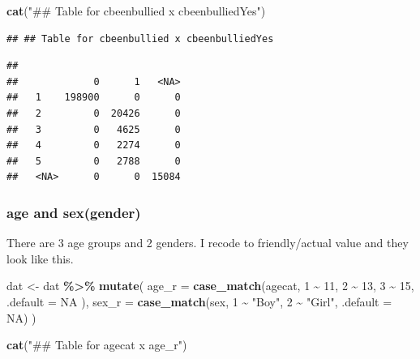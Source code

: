 \documentclass[
]{article}
\newenvironment{Shaded}{\begin{snugshade}}{\end{snugshade}}
\newcommand{\AttributeTok}[1]{\textcolor[rgb]{0.13,0.29,0.53}{#1}}
\newcommand{\ConstantTok}[1]{\textcolor[rgb]{0.56,0.35,0.01}{#1}}
\newcommand{\DecValTok}[1]{\textcolor[rgb]{0.00,0.00,0.81}{#1}}
\newcommand{\FunctionTok}[1]{\textcolor[rgb]{0.13,0.29,0.53}{\textbf{#1}}}
\newcommand{\NormalTok}[1]{#1}
\newcommand{\OtherTok}[1]{\textcolor[rgb]{0.56,0.35,0.01}{#1}}
\newcommand{\SpecialCharTok}[1]{\textcolor[rgb]{0.81,0.36,0.00}{\textbf{#1}}}
\newcommand{\StringTok}[1]{\textcolor[rgb]{0.31,0.60,0.02}{#1}}
\begin{document}
\begin{Shaded}
\begin{Highlighting}[]
\FunctionTok{cat}\NormalTok{(}\StringTok{"\#\# Table for cbeenbullied x cbeenbulliedYes"}\NormalTok{)}
\end{Highlighting}
\end{Shaded}

\begin{verbatim}
## ## Table for cbeenbullied x cbeenbulliedYes
\end{verbatim}

\begin{Shaded}
\end{Shaded}

\begin{verbatim}
##       
##             0      1   <NA>
##   1    198900      0      0
##   2         0  20426      0
##   3         0   4625      0
##   4         0   2274      0
##   5         0   2788      0
##   <NA>      0      0  15084
\end{verbatim}

\subsubsection{age and sex(gender)}\label{age-and-sexgender}

There are 3 age groups and 2 genders. I recode to friendly/actual value
and they look like this.

\begin{Shaded}
\begin{Highlighting}[]
\NormalTok{dat }\OtherTok{\textless{}{-}}\NormalTok{ dat }\SpecialCharTok{\%\textgreater{}\%}
  \FunctionTok{mutate}\NormalTok{(}
    \AttributeTok{age\_r =} \FunctionTok{case\_match}\NormalTok{(agecat,}
                             \DecValTok{1} \SpecialCharTok{\textasciitilde{}} \DecValTok{11}\NormalTok{,}
                             \DecValTok{2} \SpecialCharTok{\textasciitilde{}} \DecValTok{13}\NormalTok{,}
                             \DecValTok{3} \SpecialCharTok{\textasciitilde{}} \DecValTok{15}\NormalTok{,}
                             \AttributeTok{.default =} \ConstantTok{NA}
\NormalTok{                             ),}
    \AttributeTok{sex\_r =} \FunctionTok{case\_match}\NormalTok{(sex,}
                             \DecValTok{1} \SpecialCharTok{\textasciitilde{}} \StringTok{"Boy"}\NormalTok{,}
                             \DecValTok{2} \SpecialCharTok{\textasciitilde{}} \StringTok{"Girl"}\NormalTok{,}
                             \AttributeTok{.default =} \ConstantTok{NA}\NormalTok{)}
\NormalTok{  )}

\FunctionTok{cat}\NormalTok{(}\StringTok{"\#\# Table for agecat x age\_r"}\NormalTok{)}
\end{Highlighting}
\end{Shaded}
\end{document}

